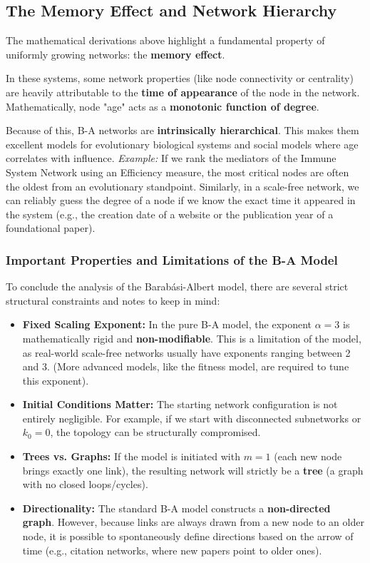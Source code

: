 \subsection{The Memory Effect and Network Hierarchy}
The mathematical derivations above highlight a fundamental property of uniformly growing networks: the \textbf{memory effect}.

In these systems, some network properties (like node connectivity or centrality) are heavily attributable to the \textbf{time of appearance} of the node in the network. Mathematically, node "age" acts as a \textbf{monotonic function of degree}.

Because of this, B-A networks are \textbf{intrinsically hierarchical}. This makes them excellent models for evolutionary biological systems and social models where age correlates with influence.
\textit{Example:} If we rank the mediators of the Immune System Network using an Efficiency measure, the most critical nodes are often the oldest from an evolutionary standpoint. Similarly, in a scale-free network, we can reliably guess the degree of a node if we know the exact time it appeared in the system (e.g., the creation date of a website or the publication year of a foundational paper).

\subsubsection{Important Properties and Limitations of the B-A Model}
To conclude the analysis of the Barabási-Albert model, there are several strict structural constraints and notes to keep in mind:

\begin{itemize}
    \item \textbf{Fixed Scaling Exponent:} In the pure B-A model, the exponent \( \alpha = 3 \) is mathematically rigid and \textbf{non-modifiable}. This is a limitation of the model, as real-world scale-free networks usually have exponents ranging between 2 and 3. (More advanced models, like the fitness model, are required to tune this exponent).
    \item \textbf{Initial Conditions Matter:} The starting network configuration is not entirely negligible. For example, if we start with disconnected subnetworks or \( k_0 = 0 \), the topology can be structurally compromised.
    \item \textbf{Trees vs. Graphs:} If the model is initiated with \( m = 1 \) (each new node brings exactly one link), the resulting network will strictly be a \textbf{tree} (a graph with no closed loops/cycles).
    \item \textbf{Directionality:} The standard B-A model constructs a \textbf{non-directed graph}. However, because links are always drawn from a new node to an older node, it is possible to spontaneously define directions based on the arrow of time (e.g., citation networks, where new papers point to older ones).
\end{itemize}

